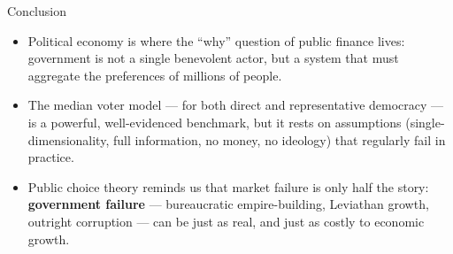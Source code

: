 \documentclass[11pt,aspectratio=169]{beamer}
\begin{document}
\begin{frame}{Conclusion}
  \begin{itemize}
    \item Political economy is where the ``why'' question of public finance lives: government is not a single benevolent actor, but a system that must aggregate the preferences of millions of people.
    \item The median voter model --- for both direct and representative democracy --- is a powerful, well-evidenced benchmark, but it rests on assumptions (single-dimensionality, full information, no money, no ideology) that regularly fail in practice.
    \item Public choice theory reminds us that market failure is only half the story: \textbf{government failure} --- bureaucratic empire-building, Leviathan growth, outright corruption --- can be just as real, and just as costly to economic growth.
  \end{itemize}
\end{frame}
\end{document}
